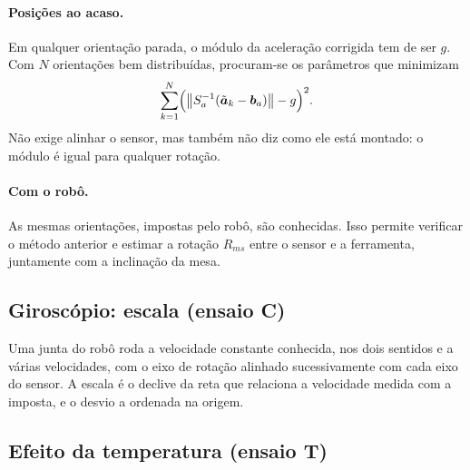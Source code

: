 \paragraph{Posições ao acaso.} Em qualquer orientação parada, o módulo da
aceleração corrigida tem de ser $g$. Com $N$ orientações bem distribuídas,
procuram-se os parâmetros que minimizam~\cite{tedaldi2014}
\begin{equation}
\sum_{k=1}^{N}\Bigl(\bigl\lVert S_a^{-1}(\tilde{\boldsymbol{a}}_k - \boldsymbol{b}_a)\bigr\rVert - g\Bigr)^2 .
\end{equation}
Não exige alinhar o sensor, mas também não diz como ele está montado: o
módulo é igual para qualquer rotação.

\paragraph{Com o robô.} As mesmas orientações, impostas pelo robô, são
conhecidas. Isso permite verificar o método anterior e estimar a rotação
$R_{ms}$ entre o sensor e a ferramenta, juntamente com a inclinação da mesa.

\begin{figure}[H]
\centering
{}
\caption{}
\label{fig:calibacc}
\end{figure}

\subsection{Giroscópio: escala (ensaio C)}

Uma junta do robô roda a velocidade constante conhecida, nos dois sentidos e
a várias velocidades, com o eixo de rotação alinhado sucessivamente com cada
eixo do sensor. A escala é o declive da reta que relaciona a velocidade medida
com a imposta, e o desvio a ordenada na origem.

\begin{figure}[H]
\centering
{}
\caption{}
\label{fig:calibgyro}
\end{figure}

\subsection{Efeito da temperatura (ensaio T)}

